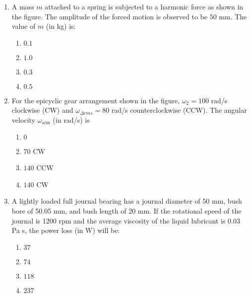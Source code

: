 \documentclass[journal,9pt,onecolumn]{IEEEtran}
\begin{document}
\begin{enumerate}
\item A mass $m$ attached to a spring is subjected to a harmonic force as shown in the figure. The amplitude of the forced motion is observed to be 50 mm. The value of $m$ (in kg) is:
\begin{center}
    
\end{center}
\begin{multicols}{4}    
\begin{enumerate}
    \item $ 0.1 $
    \item $ 1.0 $
    \item $ 0.3 $
    \item $ 0.5 $
\end{enumerate}
\end{multicols}


\item For the epicyclic gear arrangement shown in the figure, $\omega_2 = 100$ rad/s clockwise (CW) and $\omega_{\Delta rms} = 80$ rad/s counterclockwise (CCW). The angular velocity $\omega_{\text{arm}}$ (in rad/s) is
\begin{center}
    
\end{center}
\begin{multicols}{4}    
\begin{enumerate}
    \item $0$
    \item $70$ CW
    \item $140$ CCW
    \item $140$ CW
\end{enumerate}
\end{multicols}


\item A lightly loaded full journal bearing has a journal diameter of 50 mm, bush bore of 50.05 mm, and bush length of 20 mm. If the rotational speed of the journal is 1200 rpm and the average viscosity of the liquid lubricant is 0.03 Pa s, the power loss (in W) will be:
\begin{multicols}{4}
\begin{enumerate}
    \item $37$
    \item $74$
    \item $118$
    \item $237$
\end{enumerate}
\end{multicols}


\end{enumerate}
\end{document}

